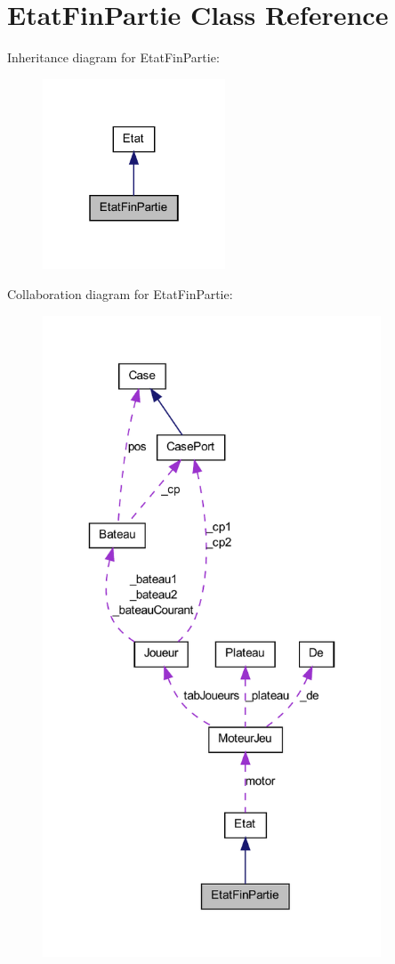 \hypertarget{class_etat_fin_partie}{
\section{EtatFinPartie Class Reference}
\label{class_etat_fin_partie}
}


Inheritance diagram for EtatFinPartie:
\nopagebreak
\begin{figure}[H]
\begin{center}
\leavevmode
\includegraphics[width=154pt]{class_etat_fin_partie__inherit__graph}
\end{center}
\end{figure}


Collaboration diagram for EtatFinPartie:
\nopagebreak
\begin{figure}[H]
\begin{center}
\leavevmode
\includegraphics[width=285pt]{class_etat_fin_partie__coll__graph}
\end{center}
\end{figure}
